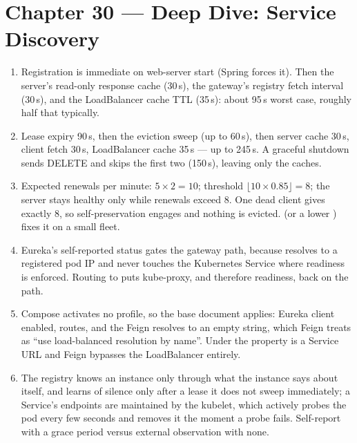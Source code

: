 \section*{Chapter 30 --- Deep Dive: Service Discovery}
\begin{enumerate}
  \item Registration is immediate on web-server start (Spring forces
  it). Then the server's read-only response cache (30\,s), the
  gateway's registry fetch interval (30\,s), and the LoadBalancer cache
  TTL (35\,s): about 95\,s worst case, roughly half that typically.
  \item Lease expiry 90\,s, then the eviction sweep (up to 60\,s), then
  server cache 30\,s, client fetch 30\,s, LoadBalancer cache 35\,s ---
  up to 245\,s. A graceful shutdown sends DELETE and skips the first two
  (150\,s), leaving only the caches.
  \item Expected renewals per minute: $5 \times 2 = 10$; threshold
  $\lfloor 10 \times 0.85 \rfloor = 8$; the server stays healthy only
  while renewals exceed 8. One dead client gives exactly 8, so
  self-preservation engages and nothing is evicted.
   (or a lower
  ) fixes it on a small fleet.
  \item Eureka's self-reported status gates the gateway path, because
   resolves to a registered pod IP and never touches the
  Kubernetes Service where readiness is enforced. Routing to
   puts kube-proxy, and therefore
  readiness, back on the path.
  \item Compose activates no profile, so the base document applies:
  Eureka client enabled,  routes, and the Feign
   resolves to an empty string, which Feign treats as ``use
  load-balanced resolution by name''. Under  the property is
  a Service URL and Feign bypasses the LoadBalancer entirely.
  \item The registry knows an instance only through what the instance
  says about itself, and learns of silence only after a lease it does
  not sweep immediately; a Service's endpoints are maintained by the
  kubelet, which actively probes the pod every few seconds and removes
  it the moment a probe fails. Self-report with a grace period versus
  external observation with none.
\end{enumerate}

